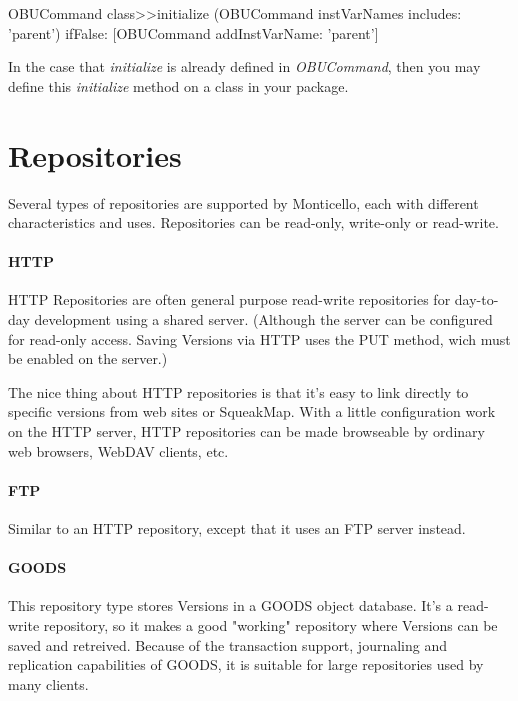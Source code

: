 \documentclass[a4paper,10pt,twoside]{book}
\begin{document}
\begin{code}

OBUCommand class>>initialize
	(OBUCommand instVarNames includes: 'parent') 
		ifFalse: [OBUCommand addInstVarName: 'parent']
\end{code}

In the case that \emph{initialize} is already defined in \emph{OBUCommand}, then you may define this \emph{initialize} method on a class in your package.


\section{Repositories} 

Several types of repositories are supported by Monticello, each with different characteristics and uses. Repositories can be read-only, write-only or read-write.

\paragraph{HTTP} HTTP Repositories are often general purpose read-write repositories for day-to-day development using a shared server. (Although the server can be configured for read-only access. Saving Versions via HTTP uses the PUT method, wich must be enabled on the server.)

The nice thing about HTTP repositories is that it's easy to link directly to specific versions from web sites or SqueakMap. With a little configuration work on the HTTP server, HTTP repositories can be made browseable by ordinary web browsers, WebDAV clients, etc.

\paragraph{FTP} Similar to an HTTP repository, except that it uses an FTP server instead.

\paragraph{GOODS} This repository type stores Versions in a GOODS object database. It's a read-write repository, so it makes a good "working" repository where Versions can be saved and retreived. Because of the transaction support, journaling and replication capabilities of GOODS, it is suitable for large repositories used by many clients.
\end{document}
